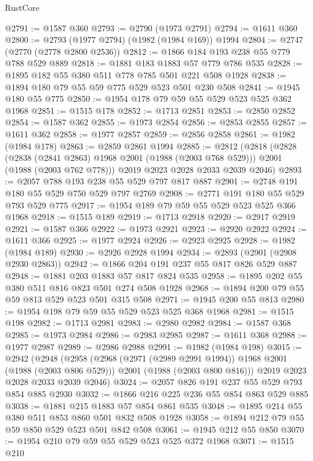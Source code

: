 \begin{lexlean}{RustCore}
\begin{coremodule}
@2791 := @1587 @360
@2793 := @2790 (@1973 @2791)
@2794 := @1611 @360
@2800 := @2793 (@1977 @2794) (@1982 (@1984 @169)) @1994
@2804 := @2747 (@2770 (@2778 @2800 @2536))
@2812 := @1866 @184 @193 @238 @55 @779 @788 @529 @889
@2818 := @1881 @183 @1883 @57 @779 @786 @535
@2828 := @1895 @182 @55 @380 @511 @778 @785 @501 @221 @508 @1928
@2838 := @1894 @180 @79 @55 @59 @775 @529 @523 @501 @230 @508
@2841 := @1945 @180 @55 @775
@2850 := @1954 @178 @79 @59 @55 @529 @523 @525 @362 @1968
@2851 := @1515 @178
@2852 := @1713 @2851
@2853 := @2850 @2852
@2854 := @1587 @362
@2855 := @1973 @2854
@2856 := @2853 @2855
@2857 := @1611 @362
@2858 := @1977 @2857
@2859 := @2856 @2858
@2861 := @1982 (@1984 @178)
@2863 := @2859 @2861 @1994
@2885 := @2812
    (@2818
      (@2828
        (@2838 (@2841 @2863) @1968 @2001 (@1988 (@2003 @768 @529)))
        @2001
        (@1988 (@2003 @762 @778)))
      @2019
      @2023
      @2028
      @2033
      @2039
      @2046)
@2893 := @2057 @788 @193 @238 @55 @529 @797 @817 @887
@2901 := @2748 @191 @180 @55 @529 @750 @529 @797 @2769
@2908 := @2771 @191 @180 @55 @529 @793 @529 @775
@2917 := @1954 @189 @79 @59 @55 @529 @523 @525 @366 @1968
@2918 := @1515 @189
@2919 := @1713 @2918
@2920 := @2917 @2919
@2921 := @1587 @366
@2922 := @1973 @2921
@2923 := @2920 @2922
@2924 := @1611 @366
@2925 := @1977 @2924
@2926 := @2923 @2925
@2928 := @1982 (@1984 @189)
@2930 := @2926 @2928 @1994
@2934 := @2893 (@2901 (@2908 @2930 @2863))
@2942 := @1866 @204 @191 @237 @55 @817 @826 @529 @887
@2948 := @1881 @203 @1883 @57 @817 @824 @535
@2958 := @1895 @202 @55 @380 @511 @816 @823 @501 @274 @508 @1928
@2968 := @1894 @200 @79 @55 @59 @813 @529 @523 @501 @315 @508
@2971 := @1945 @200 @55 @813
@2980 := @1954 @198 @79 @59 @55 @529 @523 @525 @368 @1968
@2981 := @1515 @198
@2982 := @1713 @2981
@2983 := @2980 @2982
@2984 := @1587 @368
@2985 := @1973 @2984
@2986 := @2983 @2985
@2987 := @1611 @368
@2988 := @1977 @2987
@2989 := @2986 @2988
@2991 := @1982 (@1984 @198)
@3015 := @2942
    (@2948
      (@2958
        (@2968 (@2971 (@2989 @2991 @1994)) @1968 @2001 (@1988 (@2003 @806 @529)))
        @2001
        (@1988 (@2003 @800 @816)))
      @2019
      @2023
      @2028
      @2033
      @2039
      @2046)
@3024 := @2057 @826 @191 @237 @55 @529 @793 @854 @885 @2930
@3032 := @1866 @216 @225 @236 @55 @854 @863 @529 @885
@3038 := @1881 @215 @1883 @57 @854 @861 @535
@3048 := @1895 @214 @55 @380 @511 @853 @860 @501 @832 @508 @1928
@3058 := @1894 @212 @79 @55 @59 @850 @529 @523 @501 @842 @508
@3061 := @1945 @212 @55 @850
@3070 := @1954 @210 @79 @59 @55 @529 @523 @525 @372 @1968
@3071 := @1515 @210

\end{coremodule}
\end{lexlean}
